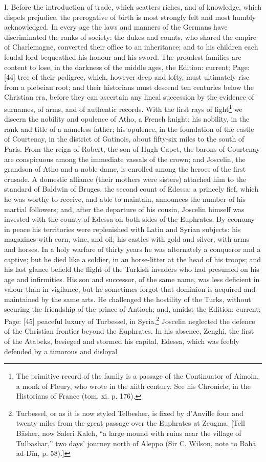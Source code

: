 I. Before the introduction of trade, which scatters riches, and of knowledge, which dispels prejudice, the prerogative of birth is most strongly felt and most humbly acknowledged. In every age the laws and manners of the Germans have discriminated the ranks of society: the dukes and counts, who shared the empire of Charlemagne, converted their office to an inheritance; and to his children each feudal lord bequeathed his honour and his sword. The proudest families are content to lose, in the darkness of the middle ages, the Edition: current; Page: [44] tree of their pedigree, which, however deep and lofty, must ultimately rise from a plebeian root; and their historians must descend ten centuries below the Christian era, before they can ascertain any lineal succession by the evidence of surnames, of arms, and of authentic records. With the first rays of light\footnote{The primitive record of the family is a passage of the Continuator of Aimoin, a monk of Fleury, who wrote in the xiith century. See his Chronicle, in the Historians of France (tom. xi. p. 176).} we discern the nobility and opulence of Atho, a French knight: his nobility, in the rank and title of a nameless father; his opulence, in the foundation of the castle of Courtenay, in the district of Gatinois, about fifty-six miles to the south of Paris. From the reign of Robert, the son of Hugh Capet, the barons of Courtenay are conspicuous among the immediate vassals of the crown; and Joscelin, the grandson of Atho and a noble dame, is enrolled among the heroes of the first crusade. A domestic alliance (their mothers were sisters) attached him to the standard of Baldwin of Bruges, the second count of Edessa: a princely fief, which he was worthy to receive, and able to maintain, announces the number of his martial followers; and, after the departure of his cousin, Joscelin himself was invested with the county of Edessa on both sides of the Euphrates. By economy in peace his territories were replenished with Latin and Syrian subjects: his magazines with corn, wine, and oil; his castles with gold and silver, with arms and horses. In a holy warfare of thirty years he was alternately a conqueror and a captive; but he died like a soldier, in an horse-litter at the head of his troops; and his last glance beheld the flight of the Turkish invaders who had presumed on his age and infirmities. His son and successor, of the same name, was less deficient in valour than in vigilance; but he sometimes forgot that dominion is acquired and maintained by the same arts. He challenged the hostility of the Turks, without securing the friendship of the prince of Antioch; and, amidst the Edition: current; Page: [45] peaceful luxury of Turbessel, in Syria,\footnote{Turbessel, or as it is now styled Telbesher, is fixed by d\texthebrew{}’Anville four and twenty miles from the great passage over the Euphrates at Zeugma. [Tell Bāsher, now Saleri Kaleh, \texthebrew{“}a large mound with ruins near the village of Tulbashar,\texthebrew{}” two days\texthebrew{}’ journey north of Aleppo (Sir C. Wilson, note to Bahā ad-Dīn, p. 58).]} Joscelin neglected the defence of the Christian frontier beyond the Euphrates. In his absence, Zenghi, the first of the Atabeks, besieged and stormed his capital, Edessa, which was feebly defended by a timorous and disloyal 